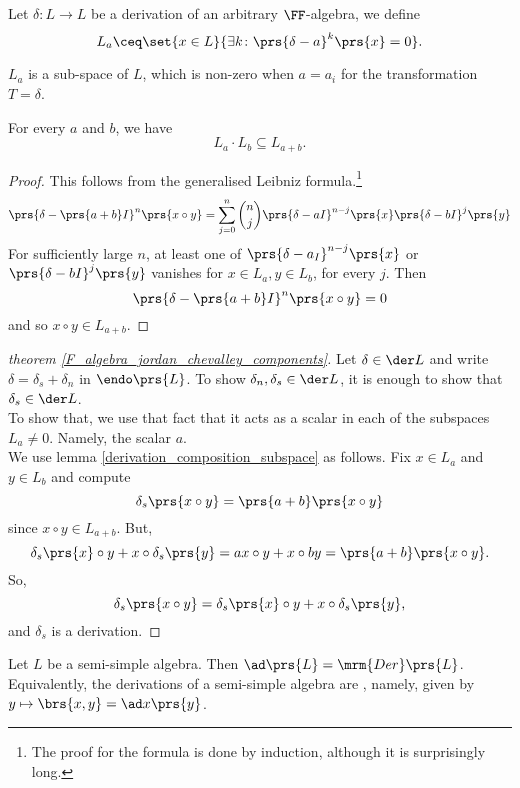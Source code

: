 \documentclass[10pt,a4paper,twoside,openany,hidelinks]{book}
\begin{document}
\begin{definition}
Let $\delta \colon L \to L$ be a derivation of an arbitrary $\FF$-algebra, we define
\[L_a \ceq \set{x \in L}{\exists k \colon \prs{\delta - a}^k\prs{x} = 0}\text{.}\]
\end{definition}
\begin{remark}
$L_a$ is a sub-space of $L$, which is non-zero when $a = a_i$ for the transformation $T = \delta$.
\end{remark}
\begin{lemma} \label{derivation_composition_subspace}
For every $a$ and $b$, we have
\[L_a \cdot L_b \subseteq L_{a+b} \text{.}\]
\end{lemma}
\begin{proof}
This follows from the generalised Leibniz formula.\footnote{The proof for the formula is done by induction, although it is surprisingly long.}
\[\prs{\delta - \prs{a+b}I}^n\prs{x \circ y} = \sum_{j=0}^n \binom{n}{j} \prs{\delta - aI}^{n-j}\prs{x}\prs{\delta - bI}^j\prs{y}\]
For sufficiently large $n$, at least one of $\prs{\delta - a_I}^{n-j}\prs{x}$ or $\prs{\delta - bI}^j \prs{y}$ vanishes for $x \in L_a, y \in L_b$, for every $j$. Then
\[\prs{\delta - \prs{a+b}I}^n \prs{x \circ y} = 0\]
and so $x \circ y \in L_{a+b}$.
\end{proof}
\begin{proof}[theorem \ref{F_algebra_jordan_chevalley_components}]
Let $\delta \in \der L$ and write $\delta = \delta_s + \delta_n$ in $\endo\prs{L}$.
To show $\delta_n, \delta_s \in \der L$, it is enough to show that $\delta_s \in \der L$.\\
To show that, we use that fact that it acts as a scalar in each of the subspaces $L_{a} \neq 0$. Namely, the scalar $a$.\\
We use lemma \ref{derivation_composition_subspace} as follows.
Fix $x \in L_a$ and $y \in L_b$ and compute
\[\delta_s\prs{x \circ y} = \prs{a+b}\prs{x \circ y}\]
since $x\circ y \in L_{a+b}$.
But, \[\delta_s\prs{x} \circ y + x \circ \delta_s\prs{y} = ax \circ y + x \circ by = \prs{a+b}\prs{x \circ y}\text{.}\]
So,
\[\delta_s\prs{x \circ y} = \delta_s\prs{x} \circ y + x \circ \delta_s\prs{y} \text{,}\]
and $\delta_s$ is a derivation.
\end{proof}

\begin{theorem} \label{inner_derivations_theorem}
Let $L$ be a semi-simple algebra. Then $\ad \prs{L} = \mrm{Der}\prs{L}$.\\
Equivalently, the derivations of a semi-simple algebra are , namely, given by $y \mapsto \brs{x,y} = \ad x \prs{y}$. 
\end{theorem}
\end{document}
